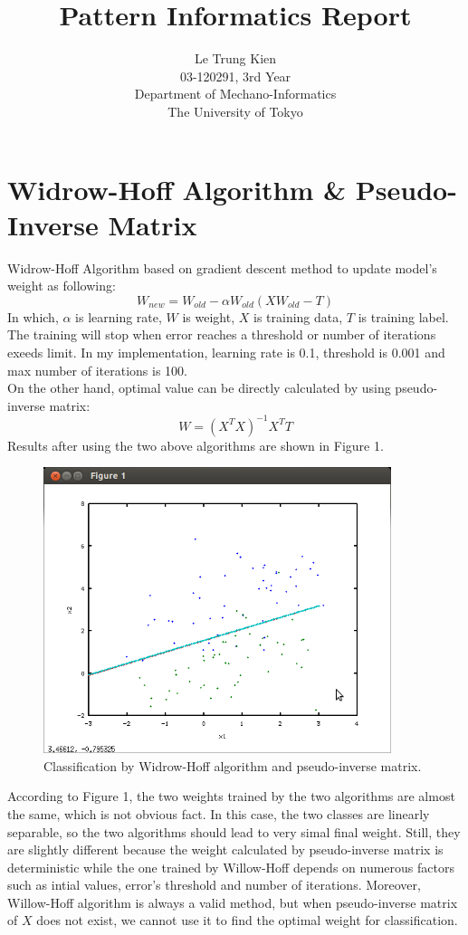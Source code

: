 \documentclass[a4paper, 11pt]{article}
\begin{document}
\title{Pattern Informatics Report}
\author{Le Trung Kien\\ 
  03-120291, 3rd Year \\
  Department of Mechano-Informatics \\ 
  The University of Tokyo
}
\maketitle

\section{Widrow-Hoff Algorithm \& Pseudo-Inverse Matrix}
Widrow-Hoff Algorithm based on gradient descent method to update model's weight as following:
\[ W_{new} = W_{old} - \alpha W_{old} (X W_{old} - T)\]
In which, $\alpha$ is learning rate, $W$ is weight, $X$ is training data, $T$ is training label. The training will stop when error reaches a threshold or number of iterations exeeds limit. In my implementation, learning rate is 0.1, threshold is 0.001 and max number of iterations is 100. \\
On the other hand, optimal value can be directly calculated by using pseudo-inverse matrix:
\[ W = (X^{T}X)^{-1}X^TT\]
Results after using the two above algorithms are shown in Figure 1.
\begin{figure}[hbt]
  \centering
  \includegraphics[width=4in]{1-2.png}
  \caption[Close up of \textit{Hemidactylus} sp.]
  {Classification by Widrow-Hoff algorithm and pseudo-inverse matrix.}
\end{figure}

According to Figure 1, the two weights trained by the two algorithms are almost the same, which is not obvious fact. In this case, the two classes are linearly separable, so the two algorithms should lead to very simal final weight. Still, they are slightly different because the weight calculated by pseudo-inverse matrix is deterministic while the one trained by Willow-Hoff depends on numerous factors such as intial values, error's threshold and number of iterations. Moreover, Willow-Hoff algorithm is always a valid method, but when pseudo-inverse matrix of $X$ does not exist, we cannot use it to find the optimal weight for classification. \\
\end{document}
